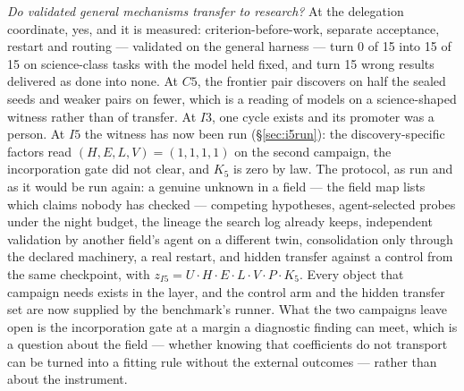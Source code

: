 \emph{Do validated general mechanisms transfer to research?} At the delegation coordinate, yes, and it is measured: criterion-before-work, separate acceptance, restart and routing --- validated on the general harness --- turn 0 of 15 into 15 of 15 on science-class tasks with the model held fixed, and turn 15 wrong results delivered as done into none. At $C5$, the frontier pair discovers on half the sealed seeds and weaker pairs on fewer, which is a reading of models on a science-shaped witness rather than of transfer. At $I3$, one cycle exists and its promoter was a person. At $I5$ the witness has now been run (\S\ref{sec:i5run}): the discovery-specific factors read $(H,E,L,V) = (1,1,1,1)$ on the second campaign, the incorporation gate did not clear, and $K_5$ is zero by law. The protocol, as run and as it would be run again: a genuine unknown in a field --- the field map lists which claims nobody has checked --- competing hypotheses, agent-selected probes under the night budget, the lineage the search log already keeps, independent validation by another field's agent on a different twin, consolidation only through the declared machinery, a real restart, and hidden transfer against a control from the same checkpoint, with $z_{I5} = U \cdot H \cdot E \cdot L \cdot V \cdot P \cdot K_5$. Every object that campaign needs exists in the layer, and the control arm and the hidden transfer set are now supplied by the benchmark's runner. What the two campaigns leave open is the incorporation gate at a margin a diagnostic finding can meet, which is a question about the field --- whether knowing that coefficients do not transport can be turned into a fitting rule without the external outcomes --- rather than about the instrument.

